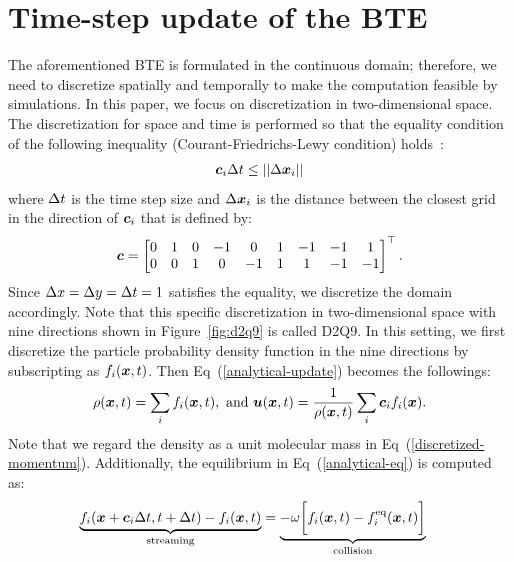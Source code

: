 \section{Time-step update of the BTE}
The aforementioned BTE is formulated in the 
continuous domain; therefore,
we need to discretize spatially and 
temporally to make the computation 
feasible by simulations.
In this paper, we focus on discretization
in two-dimensional space.
The discretization for space and time
is performed so that the equality condition of 
the following inequality
(Courant-Friedrichs-Lewy condition) holds~\cite{peyretcomputational, sterling1996stability}:
\begin{equation}
\begin{aligned}
  \boldsymbol{c}_i \Delta t \leq || \Delta \boldsymbol{x}_i ||
\end{aligned}
\end{equation}
where $\Delta t$ is the time step size 
and $\Delta \boldsymbol{x}_i$ is the distance between 
the closest grid in the direction
of $\boldsymbol{c}_i$ that is defined by:
\begin{equation}
\begin{aligned}
  \boldsymbol{c} = \begin{bmatrix}
    0 & 1 & 0 & -1 & 0 & 1 & -1 & -1 & 1 \\
    0 & 0 & 1 & 0 & -1 & 1 & 1 & -1 & -1 \\
  \end{bmatrix}^\top.
\end{aligned}
\label{d2q9-velocity}
\end{equation}
Since $\Delta x = \Delta y = \Delta t = 1$ satisfies the equality, 
we discretize the domain accordingly.
Note that this specific discretization in two-dimensional
space with nine directions shown in 
Figure~\ref{fig:d2q9} is called D2Q9.
In this setting, 
we first discretize
the particle probability density function
in the nine directions by subscripting 
as $f_i(\boldsymbol{x}, t)$.
Then Eq~(\ref{analytical-update}) becomes the followings:
\begin{equation}
  \begin{aligned}
    \rho(\boldsymbol{x}, t) = \sum_i f_i(\boldsymbol{x}, t), \text{ and }
    \boldsymbol{u}(\boldsymbol{x}, t) = 
    \frac{1}{\rho(\boldsymbol{x}, t)} \sum_i \boldsymbol{c}_i f_i(\boldsymbol{x}). \\
  \end{aligned}
  \label{discretized-momentum}
\end{equation}
Note that we regard the density as
a unit molecular mass in Eq~(\ref{discretized-momentum}).
Additionally, the equilibrium in Eq~(\ref{analytical-eq}) is computed as:
\begin{equation}
\begin{aligned}
  \underbrace{f_i(\boldsymbol{x} + \boldsymbol{c}_i\Delta t , t + \Delta t) - f_i(\boldsymbol{x}, t)}_{
    \text{streaming}
  } &= 
  \underbrace{- \omega 
  \biggl[
    f_i(\boldsymbol{x}, t) -
    f^{\rm eq}_i(\boldsymbol{x}, t)
  \biggl]}_{
    \text{collision}
  }
\end{aligned}
\label{discretized-streaming}
\end{equation}
